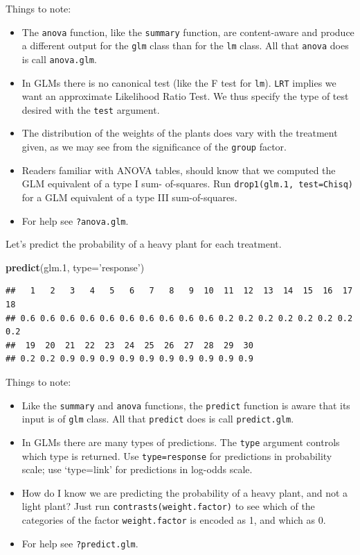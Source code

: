 \documentclass[]{book}
\newenvironment{Shaded}{\begin{snugshade}}{\end{snugshade}}
\newcommand{\DataTypeTok}[1]{\textcolor[rgb]{0.13,0.29,0.53}{#1}}
\newcommand{\FloatTok}[1]{\textcolor[rgb]{0.00,0.00,0.81}{#1}}
\newcommand{\KeywordTok}[1]{\textcolor[rgb]{0.13,0.29,0.53}{\textbf{#1}}}
\newcommand{\NormalTok}[1]{#1}
\newcommand{\StringTok}[1]{\textcolor[rgb]{0.31,0.60,0.02}{#1}}
\providecommand{\tightlist}{%
  \setlength{\itemsep}{0pt}\setlength{\parskip}{0pt}}
\theoremstyle{definition}
\theoremstyle{definition}
\theoremstyle{definition}
\theoremstyle{remark}
\begin{document}
Things to note:

\begin{itemize}
\tightlist
\item
  The \texttt{anova} function, like the \texttt{summary} function, are content-aware and produce a different output for the \texttt{glm} class than for the \texttt{lm} class. All that \texttt{anova} does is call \texttt{anova.glm}.
\item
  In GLMs there is no canonical test (like the F test for \texttt{lm}). \texttt{LRT} implies we want an approximate Likelihood Ratio Test.
  We thus specify the type of test desired with the \texttt{test} argument.
\item
  The distribution of the weights of the plants does vary with the treatment given, as we may see from the significance of the \texttt{group} factor.
\item
  Readers familiar with ANOVA tables, should know that we computed the GLM equivalent of a type I sum- of-squares.
  Run \texttt{drop1(glm.1,\ test=\textquotesingle{}Chisq\textquotesingle{})} for a GLM equivalent of a type III sum-of-squares.
\item
  For help see \texttt{?anova.glm}.
\end{itemize}

Let's predict the probability of a heavy plant for each treatment.

\begin{Shaded}
\begin{Highlighting}[]
\KeywordTok{predict}\NormalTok{(glm}\FloatTok{.1}\NormalTok{, }\DataTypeTok{type=}\StringTok{'response'}\NormalTok{)}
\end{Highlighting}
\end{Shaded}

\begin{verbatim}
##   1   2   3   4   5   6   7   8   9  10  11  12  13  14  15  16  17  18 
## 0.6 0.6 0.6 0.6 0.6 0.6 0.6 0.6 0.6 0.6 0.2 0.2 0.2 0.2 0.2 0.2 0.2 0.2 
##  19  20  21  22  23  24  25  26  27  28  29  30 
## 0.2 0.2 0.9 0.9 0.9 0.9 0.9 0.9 0.9 0.9 0.9 0.9
\end{verbatim}

Things to note:

\begin{itemize}
\tightlist
\item
  Like the \texttt{summary} and \texttt{anova} functions, the \texttt{predict} function is aware that its input is of \texttt{glm} class. All that \texttt{predict} does is call \texttt{predict.glm}.
\item
  In GLMs there are many types of predictions. The \texttt{type} argument controls which type is returned. Use \texttt{type=response} for predictions in probability scale; use `type=link' for predictions in log-odds scale.
\item
  How do I know we are predicting the probability of a heavy plant, and not a light plant? Just run \texttt{contrasts(weight.factor)} to see which of the categories of the factor \texttt{weight.factor} is encoded as 1, and which as 0.
\item
  For help see \texttt{?predict.glm}.
\end{itemize}
\end{document}
